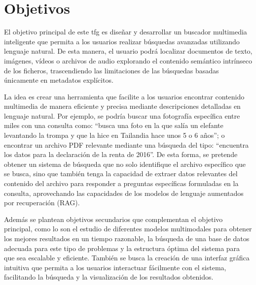 
\chapter{Objetivos}
\label{objetivos}

El objetivo principal de este \gls{tfg} es diseñar y desarrollar un buscador multimedia inteligente que permita a los usuarios realizar búsquedas avanzadas utilizando lenguaje natural. De esta manera, el usuario podrá localizar documentos de texto, imágenes, vídeos o archivos de audio explorando el contenido semántico intrínseco de los ficheros, trascendiendo las limitaciones de las búsquedas basadas únicamente en metadatos explícitos.

La idea es crear una herramienta que facilite a los usuarios encontrar contenido multimedia de manera eficiente y precisa mediante descripciones detalladas en lenguaje natural. Por ejemplo, se podría buscar una fotografía específica entre miles con una consulta como: “busca una foto en la que salía un elefante levantando la trompa y que la hice en Tailandia hace unos 5 o 6 años”; o encontrar un archivo PDF relevante mediante una búsqueda del tipo: “encuentra los datos para la declaración de la renta de 2016”.
De esta forma, se pretende obtener un sistema de búsqueda que no solo identifique el archivo específico que se busca, sino que también tenga la capacidad de extraer datos relevantes del contenido del archivo para responder a preguntas específicas formuladas en la consulta, aprovechando las capacidades de los modelos de lenguaje aumentados por recuperación (RAG).

Además se plantean objetivos secundarios que complementan el objetivo principal, como lo son el estudio de diferentes modelos multimodales para obtener los mejores resultados en un tiempo razonable, la búsqueda de una base de datos adecuada para este tipo de problemas y la estructura óptima del sistema para que sea escalable y eficiente. También se busca la creación de una interfaz gráfica intuitiva que permita a los usuarios interactuar fácilmente con el sistema, facilitando la búsqueda y la visualización de los resultados obtenidos.
